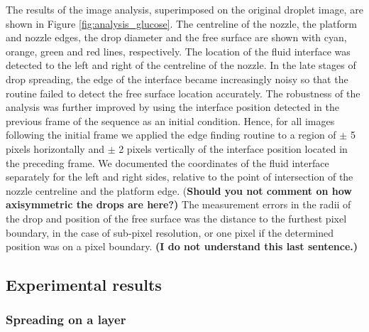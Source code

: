 \documentclass[aip,graphicx]{revtex4-1}
\begin{document}
The results of the image analysis, superimposed on the original droplet image, are shown in Figure \ref{fig:analysis_glucose}. The centreline of the nozzle, the platform and nozzle edges, the drop diameter and the free surface are shown with cyan, orange, green and red lines, respectively.  The location of the fluid interface was detected to the left and right of the centreline of the nozzle.
In the late stages of drop spreading, the edge of the interface became increasingly noisy so that the routine failed to detect the free surface location accurately. The robustness of the analysis was further improved by using the interface position detected in the previous frame of the sequence as an initial condition. Hence, for all images following the initial frame we applied the edge finding routine to a region of $\pm$ 5 pixels horizontally and $\pm$ 2 pixels vertically of the interface position located in the preceding frame. We documented the coordinates of the fluid interface separately for the left and right sides,  relative to the point of intersection of the nozzle centreline and the platform edge. {(\bf Should you not comment on how axisymmetric the drops are here?)}
The measurement errors in the radii of the drop and position of the free surface was the distance to the furthest pixel boundary, in the case of sub-pixel resolution, or one pixel if the determined position was on a pixel boundary. {\bf (I do not understand this last sentence.)}


\subsection{Experimental results}
\label{expresults}

\subsubsection{Spreading on a layer}
\label{sec:expt_spreading_on_layer}
\end{document}
